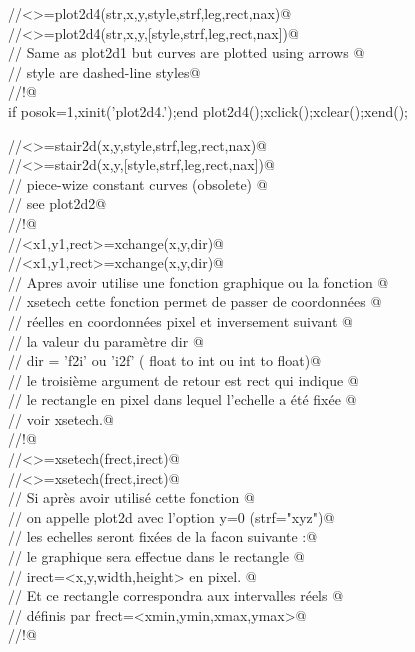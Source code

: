 
\verb@//<>=plot2d4(str,x,y,style,strf,leg,rect,nax)@ \\
\verb@//<>=plot2d4(str,x,y,[style,strf,leg,rect,nax])@ \\
\verb@// Same as plot2d1 but curves are plotted using arrows @ \\
\verb@// style are dashed-line styles@ \\
\verb@//!@ \\
if posok=1,xinit('plot2d4.');end
plot2d4();xclick();xclear();xend();


\verb@//<>=stair2d(x,y,style,strf,leg,rect,nax)@ \\
\verb@//<>=stair2d(x,y,[style,strf,leg,rect,nax])@ \\
\verb@// piece-wize constant curves (obsolete) @ \\
\verb@// see plot2d2@ \\
\verb@//!@ \\

\verb@//<x1,y1,rect>=xchange(x,y,dir)@ \\
\verb@//<x1,y1,rect>=xchange(x,y,dir)@ \\
\verb@// Apres avoir utilise une fonction graphique ou la fonction @ \\
\verb@// xsetech cette fonction permet de passer de coordonn\'ees @ \\
\verb@// r\'eelles en coordonn\'ees pixel et inversement suivant @ \\
\verb@// la valeur du param\`etre dir @ \\
\verb@// dir = 'f2i' ou 'i2f' ( float to int ou int to float)@ \\
\verb@// le troisi\`eme argument de retour est rect qui indique @ \\
\verb@// le rectangle en pixel dans lequel l'echelle a \'et\'e fix\'ee @ \\
\verb@// voir xsetech.@ \\
\verb@//!@ \\


\verb@//<>=xsetech(frect,irect)@ \\
\verb@//<>=xsetech(frect,irect)@ \\
\verb@// Si apr\`es avoir utilis\'e cette fonction @ \\
\verb@// on appelle plot2d avec l'option y=0 (strf="xyz")@ \\
\verb@// les echelles seront fix\'ees de la facon suivante :@ \\
\verb@//   le graphique sera effectue dans le rectangle @ \\
\verb@//      irect=<x,y,width,height> en pixel. @ \\
\verb@//   Et ce rectangle correspondra aux intervalles r\'eels @ \\
\verb@//   d\'efinis par frect=<xmin,ymin,xmax,ymax>@ \\
\verb@//!@ \\


